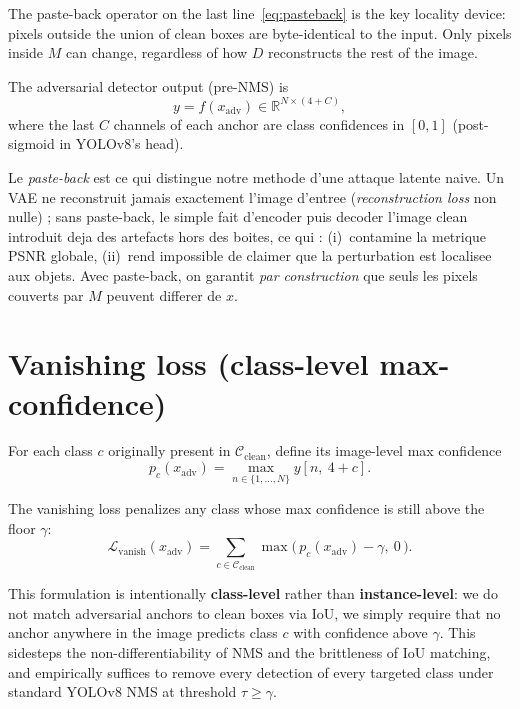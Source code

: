 \documentclass[11pt,a4paper]{article}
\newcommand{\R}{\mathbb{R}}
\begin{document}
\noindent The paste-back operator on the last line~\eqref{eq:pasteback} is the key
locality device: pixels outside the union of clean boxes are byte-identical
to the input. Only pixels inside $M$ can change, regardless of how $D$
reconstructs the rest of the image.

\noindent The adversarial detector output (pre-NMS) is
\begin{equation}
y = f(x_{\text{adv}}) \in \R^{N \times (4 + C)},
\end{equation}
where the last $C$ channels of each anchor are class confidences in $[0, 1]$
(post-sigmoid in YOLOv8's head).

\begin{supervisornote}
Le \emph{paste-back} est ce qui distingue notre methode d'une attaque
latente naive. Un VAE ne reconstruit jamais exactement l'image d'entree
(\textit{reconstruction loss} non nulle) ; sans paste-back, le simple fait
d'encoder puis decoder l'image clean introduit deja des artefacts hors
des boites, ce qui :
(i)~contamine la metrique PSNR globale,
(ii)~rend impossible de claimer que la perturbation est localisee aux
objets. Avec paste-back, on garantit \emph{par construction} que seuls
les pixels couverts par $M$ peuvent differer de $x$.
\end{supervisornote}

\section{Vanishing loss (class-level max-confidence)}\label{sec:vanish}

For each class $c$ originally present in $\mathcal{C}_{\text{clean}}$, define
its image-level max confidence
\begin{equation}
p_c(x_{\text{adv}}) = \max_{n \in \{1,\ldots,N\}} y[n,\ 4 + c].
\end{equation}

\noindent The vanishing loss penalizes any class whose max confidence is still
above the floor $\gamma$:
\begin{equation}
\mathcal{L}_{\text{vanish}}(x_{\text{adv}})
   = \sum_{c \in \mathcal{C}_{\text{clean}}}
       \max\bigl(\, p_c(x_{\text{adv}}) - \gamma,\ 0 \,\bigr).
\label{eq:vanish}
\end{equation}

This formulation is intentionally \textbf{class-level} rather than
\textbf{instance-level}: we do not match adversarial anchors to clean boxes
via IoU, we simply require that no anchor anywhere in the image predicts
class $c$ with confidence above $\gamma$. This sidesteps the
non-differentiability of NMS and the brittleness of IoU matching, and
empirically suffices to remove every detection of every targeted class
under standard YOLOv8 NMS at threshold $\tau \geq \gamma$.
\end{document}
